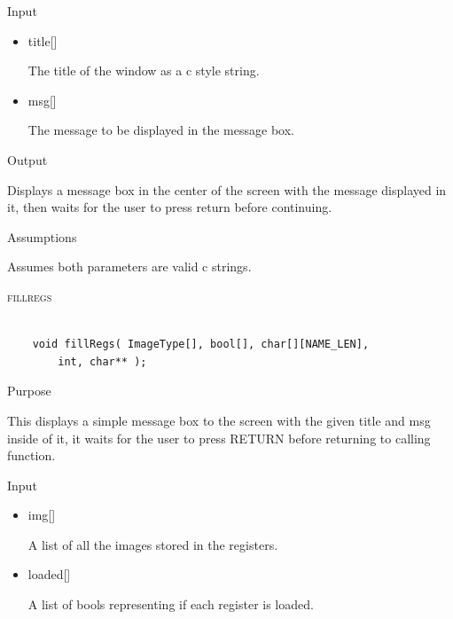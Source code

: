 \documentclass[pdftex, 11pt]{article}
\begin{document}
\begin{description}
\begin{description}
			\item{Input}

				\begin{itemize}
					
					\item{title[]}

						The title of the window as a c style string.

					\item{msg[]}

						The message to be displayed in the message box.

				\end{itemize}


			\item{Output}
				
				Displays a message box in the center of the screen with
				the message displayed in it, then waits for the user to press
				return before continuing.

			\item{Assumptions}

				Assumes both parameters are valid c strings.

		\end{description}



	\item{\textsc{fillregs}}

		\begin{lstlisting}

	void fillRegs( ImageType[], bool[], char[][NAME_LEN], 
		int, char** );
		\end{lstlisting}

		\begin{description}
			\item{Purpose}

				This displays a simple message box to the screen with the given title and msg
				inside of it, it waits for the user to press RETURN before returning to
				calling function.

			\item{Input}

				\begin{itemize}

					\item{img[]}

						A list of all the images stored in the registers.

					\item{loaded[]}

						A list of bools representing if each register is loaded.


\end{itemize}
\end{description}
\end{description}
\end{document}
